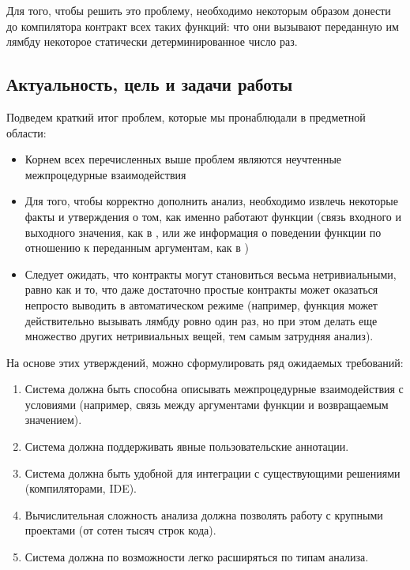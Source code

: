 Для того, чтобы решить это проблему, необходимо некоторым образом донести до компилятора контракт всех таких функций: что они вызывают переданную им лямбду некоторое статически детерминированное число раз.





\subsection{Актуальность, цель и задачи работы}

Подведем краткий итог проблем, которые мы пронаблюдали в предметной области:

\begin{itemize}
    \item Корнем всех перечисленных выше проблем являются неучтенные межпроцедурные взаимодействия

    \item Для того, чтобы корректно дополнить анализ, необходимо извлечь некоторые факты и утверждения о том, как именно работают функции (связь входного и выходного значения, как в , или же информация о поведении функции по отношению к переданным аргументам, как в )

    \item Следует ожидать, что контракты могут становиться весьма нетривиальными, равно как и то, что даже достаточно простые контракты может оказаться непросто выводить в автоматическом режиме (например, функция может действительно вызывать лямбду ровно один раз, но при этом делать еще множество других нетривиальных вещей, тем самым затрудняя анализ).
\end{itemize}

На основе этих утверждений, можно сформулировать ряд ожидаемых требований:

\begin{enumerate}
  \item Система должна быть способна описывать межпроцедурные взаимодействия с условиями (например, связь между аргументами функции и возвращаемым значением).

  \item Система должна поддерживать явные пользовательские аннотации.

  \item Система должна быть удобной для интеграции с существующими решениями (компиляторами, IDE).

  \item Вычислительная сложность анализа должна позволять работу с крупными проектами (от сотен тысяч строк кода).

  \item Система должна по возможности легко расширяться по типам анализа.
\end{enumerate}

